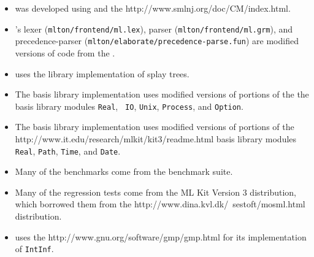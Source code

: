 \begin{itemize}

\item
{\mlton} was developed using
and the
		  {http://www.smlnj.org/doc/CM/index.html}.

\item
{\mlton}'s lexer ({\tt mlton/frontend/ml.lex}), 
parser ({\tt mlton/frontend/ml.grm}),
and precedence-parser ({\tt mlton/elaborate/precedence-parse.fun})
are modified versions of code from the {\smlnj}.

\item
{\mlton} uses the {\smlnj} library implementation of splay trees.

\item
The {\mlton} basis library implementation uses modified versions of
portions of the the {\smlnj} basis library modules {\tt Real}, {\tt
IO}, {\tt Unix}, {\tt Process}, and {\tt Option}.

\item
The {\mlton} basis library implementation uses modified versions of
portions of the
		  {http://www.it.edu/research/mlkit/kit3/readme.html}
basis library modules {\tt Real}, {\tt Path}, {\tt Time}, and
{\tt Date}.

\item
Many of the benchmarks come from the {\smlnj} benchmark suite.

\item
Many of the regression tests come from the ML Kit Version 3 distribution, which
borrowed them from the
		  {http://www.dina.kvl.dk/~sestoft/mosml.html}
distribution.

\item
{\mlton} uses the
		  {http://www.gnu.org/software/gmp/gmp.html}
for its implementation of {\tt IntInf}.

\end{itemize}
